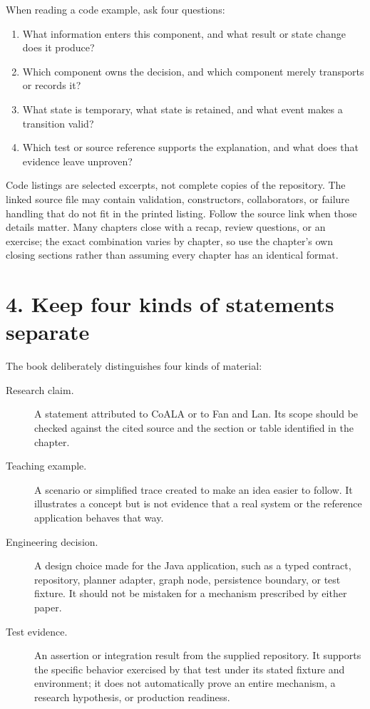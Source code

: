 When reading a code example, ask four questions:
\begin{enumerate}
  \item What information enters this component, and what result or state change does it produce?
  \item Which component owns the decision, and which component merely transports or records it?
  \item What state is temporary, what state is retained, and what event makes a transition valid?
  \item Which test or source reference supports the explanation, and what does that evidence leave unproven?
\end{enumerate}

Code listings are selected excerpts, not complete copies of the repository. The linked source file may contain validation, constructors, collaborators, or failure handling that do not fit in the printed listing. Follow the source link when those details matter. Many chapters close with a recap, review questions, or an exercise; the exact combination varies by chapter, so use the chapter's own closing sections rather than assuming every chapter has an identical format.

\section*{4. Keep four kinds of statements separate}

The book deliberately distinguishes four kinds of material:
\begin{description}
  \item[Research claim.] A statement attributed to CoALA or to Fan and Lan. Its scope should be checked against the cited source and the section or table identified in the chapter.
  \item[Teaching example.] A scenario or simplified trace created to make an idea easier to follow. It illustrates a concept but is not evidence that a real system or the reference application behaves that way.
  \item[Engineering decision.] A design choice made for the Java application, such as a typed contract, repository, planner adapter, graph node, persistence boundary, or test fixture. It should not be mistaken for a mechanism prescribed by either paper.
  \item[Test evidence.] An assertion or integration result from the supplied repository. It supports the specific behavior exercised by that test under its stated fixture and environment; it does not automatically prove an entire mechanism, a research hypothesis, or production readiness.
\end{description}

